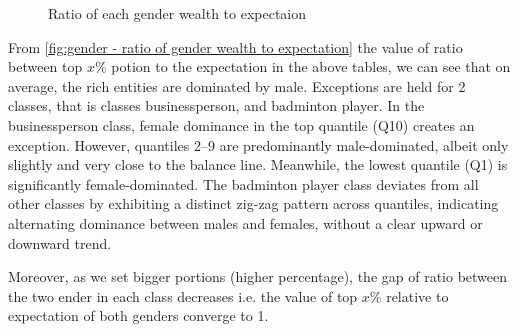 \begin{figure}[!h]
\centering 
{}


\caption{Ratio of each gender wealth to expectaion} \label{fig:gender - ratio of gender wealth to expectation}

\end{figure}

From \autoref{fig:gender - ratio of gender wealth to expectation} the value of ratio between top \(x\)\% potion to the expectation in the above tables, we can see that on average, the rich entities are dominated by male. Exceptions are held for 2 classes, that is classes businessperson, and badminton player. In the businessperson class, female dominance in the top quantile (Q10) creates an exception. However, quantiles 2–9 are predominantly male-dominated, albeit only slightly and very close to the balance line. Meanwhile, the lowest quantile (Q1) is significantly female-dominated. The badminton player class deviates from all other classes by exhibiting a distinct zig-zag pattern across quantiles, indicating alternating dominance between males and females, without a clear upward or downward trend.

Moreover, as we set bigger portions (higher percentage), the gap of ratio between the two ender in each class decreases i.e. the value of top \(x\)\% relative to expectation of both genders converge to 1.